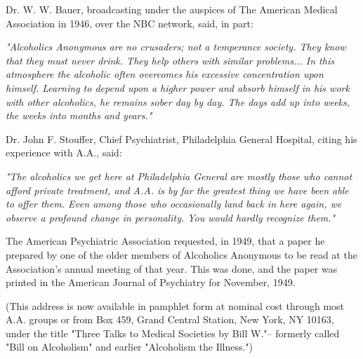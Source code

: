 \begin{biblechapter}
    Dr. W. W. Bauer, 
    broadcasting under the auspices of The American Medical Association 
    in 1946, over the NBC network, said, in part:

\verse\emph{"Alcoholics Anonymous are no crusaders; 
    not a temperance society.  
\verse They know that they must never drink.
\verse They help others with similar problems... 
\verse In this atmosphere the alcoholic often overcomes 
    his excessive concentration upon himself.
\verse Learning to depend upon a higher power 
    and absorb himself in his work with other alcoholics, 
    he remains sober day by day.
\verse The days add up into weeks, the weeks into months and years."
}
\end{biblechapter}


\begin{biblechapter}
    Dr. John F. Stouffer, Chief Psychiatrist, 
    Philadelphia General Hospital, 
    citing his experience with A.A., said:

\verse\emph{ "The alcoholics we get here at Philadelphia General 
    are mostly those who cannot afford private treatment, 
    and A.A. is by far the greatest thing we have been able to offer them.
\verse Even among those who occasionally land back in here again, 
    we observe a profound change in personality.
\verse You would hardly recognize them."
}
\end{biblechapter}


\begin{biblechapter}
    The American Psychiatric Association requested, in 1949, 
    that a paper he prepared 
    by one of the older members of Alcoholics Anonymous 
    to be read at the Association's annual meeting of that year.
\verse This was done, 
    and the paper was printed in the American Journal of Psychiatry 
    for November, 1949.

\verse (This address is now available in pamphlet form 
    at nominal cost through most A.A. groups 
    or from Box 459, Grand Central Station, New York, NY 10163, 
    under the title "Three Talks to Medical Societies by Bill W."--
    formerly called "Bill on Alcoholism" 
    and earlier "Alcoholism the Illness.")
\end{biblechapter}
